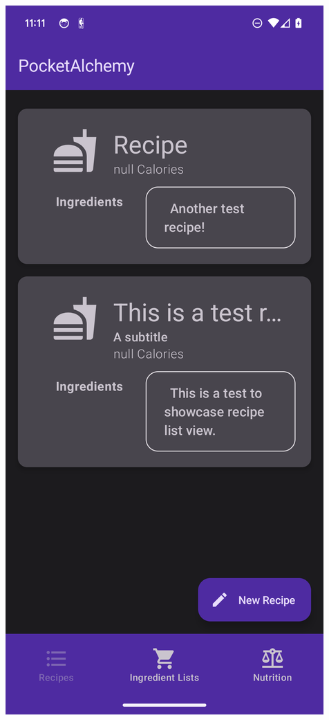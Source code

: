 \documentclass[12pt]{article}
\begin{document}
\begin{center}
\includegraphics[scale=0.175]{../res/img/RecipeListDark.png}

\end{center}
\end{document}
